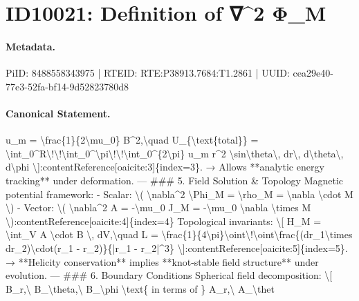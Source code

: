 \section*{ID10021: Definition of ∇\textasciicircum{}2 Φ\_M}
\paragraph{Metadata.}
PiID: 8488558343975 | RTEID: RTE:P38913.7684:T1.2861 | UUID: cea29e40-77e3-52fa-bf14-9d52823780d8

\paragraph{Canonical Statement.}
u\_m = \textbackslash{}frac\{1\}\{2\textbackslash{}mu\_0\} B\textasciicircum{}2,\textbackslash{}quad U\_\{\textbackslash{}text\{total\}\} = \textbackslash{}int\_0\textasciicircum{}R\textbackslash{}!\textbackslash{}!\textbackslash{}int\_0\textasciicircum{}\textbackslash{}pi\textbackslash{}!\textbackslash{}!\textbackslash{}int\_0\textasciicircum{}\{2\textbackslash{}pi\} u\_m r\textasciicircum{}2 \textbackslash{}sin\textbackslash{}theta\textbackslash{}, dr\textbackslash{}, d\textbackslash{}theta\textbackslash{}, d\textbackslash{}phi \textbackslash{}]:contentReference[oaicite:3]\{index=3\}. → Allows **analytic energy tracking** under deformation. --- \#\#\# 5. Field Solution \& Topology Magnetic potential framework: - Scalar: \textbackslash{}( \textbackslash{}nabla\textasciicircum{}2 \textbackslash{}Phi\_M = \textbackslash{}rho\_M = \textbackslash{}nabla \textbackslash{}cdot M \textbackslash{}) - Vector: \textbackslash{}( \textbackslash{}nabla\textasciicircum{}2 A = -\textbackslash{}mu\_0 J\_M = -\textbackslash{}mu\_0 \textbackslash{}nabla \textbackslash{}times M \textbackslash{}):contentReference[oaicite:4]\{index=4\} Topological invariants: \textbackslash{}[ H\_M = \textbackslash{}int\_V A \textbackslash{}cdot B \textbackslash{}, dV,\textbackslash{}quad L = \textbackslash{}frac\{1\}\{4\textbackslash{}pi\}\textbackslash{}oint\textbackslash{}!\textbackslash{}oint\textbackslash{}frac\{(dr\_1\textbackslash{}times dr\_2)\textbackslash{}cdot(r\_1 - r\_2)\}\{|r\_1 - r\_2|\textasciicircum{}3\} \textbackslash{}]:contentReference[oaicite:5]\{index=5\}. → **Helicity conservation** implies **knot-stable field structure** under evolution. --- \#\#\# 6. Boundary Conditions Spherical field decomposition: \textbackslash{}[ B\_r,\textbackslash{} B\_\textbackslash{}theta,\textbackslash{} B\_\textbackslash{}phi \textbackslash{}text\{ in terms of \} A\_r,\textbackslash{} A\_\textbackslash{}thet

